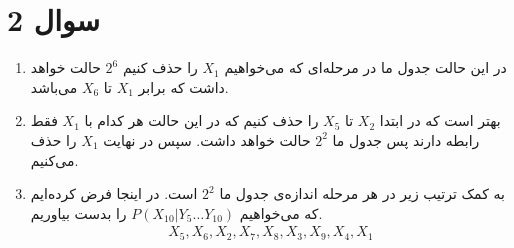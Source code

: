 \section*{سوال 2}
\begin{enumerate}
    \item در این حالت جدول ما در مرحله‌ای که می‌خواهیم
    $X_1$
    را حذف کنیم
    $2^6$
    حالت خواهد داشت که برابر
    $X_1$ تا $X_6$
    می‌باشد.
    \item بهتر است که در ابتدا
    $X_2$ تا $X_5$
    را حذف کنیم که در این حالت هر کدام با
    $X_1$
    فقط رابطه دارند پس جدول ما
    $2^2$
    حالت خواهد داشت.
    سپس در نهایت
    $X_1$
    را حذف می‌کنیم.
    \item به کمک ترتیب زیر در هر مرحله اندازه‌ی جدول ما
    $2^2$
    است. در اینجا فرض کرده‌ایم که می‌خواهیم
    $P(X_{10}| Y_5 \dots Y_{10})$
    را بدست بیاوریم.
    \begin{gather*}
        X_5, X_6, X_2, X_7, X_8, X_3, X_9, X_4, X_1
    \end{gather*}
\end{enumerate}